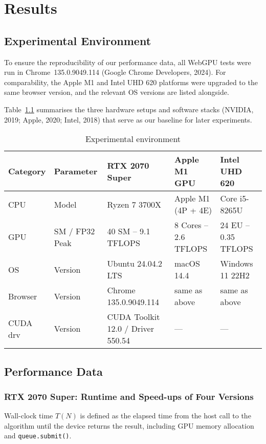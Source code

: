 \documentclass[PhD]{PHlab-thesis}
\begin{document}
	
\chapter{Results}
\section{Experimental Environment}
To ensure the reproducibility of our performance data, all WebGPU tests were run in Chrome~135.0.9049.114 (Google Chrome Developers, 2024). For comparability, the Apple M1 and Intel UHD 620 platforms were upgraded to the same browser version, and the relevant OS versions are listed alongside.


Table~\ref{tab:exp_env} summarises the three hardware setups and software stacks (NVIDIA, 2019; Apple, 2020; Intel, 2018) that serve as our baseline for later experiments.


\begin{table}[htbp]
  \centering
  \caption{Experimental environment}
  \label{tab:exp_env}
  \setlength{\tabcolsep}{8pt}
  \renewcommand{\arraystretch}{1.4}
  \begin{tabularx}{\textwidth}{@{}lX X X X@{}}
    \toprule
    Category & Parameter & RTX 2070 Super & Apple M1 GPU & Intel UHD 620 \\
    \midrule
    CPU      & Model                 & Ryzen 7 3700X        & Apple M1 (4P + 4E) & Core i5-8265U \\
    GPU      & SM / FP32 Peak        & 40 SM – 9.1 TFLOPS   & 8 Cores – 2.6 TFLOPS & 24 EU – 0.35 TFLOPS \\
    OS       & Version               & Ubuntu 24.04.2 LTS   & macOS 14.4           & Windows 11 22H2 \\
    Browser  & Version               & Chrome 135.0.9049.114 & same as above        & same as above \\
    CUDA drv & Version               & CUDA Toolkit 12.0 / Driver 550.54 & — & — \\
    \bottomrule
  \end{tabularx}
\end{table}

\section{Performance Data}
\subsection{RTX 2070 Super: Runtime and Speed-ups of Four Versions}
Wall-clock time $T(N)$ is defined as the elapsed time from the host call to the algorithm until the device returns the result, including GPU memory allocation and \texttt{queue.submit()}.
\end{document}
